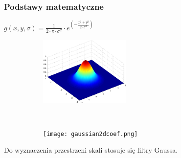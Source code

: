 \begin{frame}
	\frametitle{Podstawy matematyczne}
	
	\begin{center}
		$ g(x,y,\sigma)= \frac{1}{2 \cdot \pi \cdot \sigma ^ {2} }\cdot e^{(-\frac{x^{2} + y^{2}}{2 \cdot \sigma ^{2}})} $

	\begin{figure}[h]
		\begin{center}
			\begin{subfigure}[b]{4.5cm}
				\centering
				\includegraphics[width=4.5cm]{gaussian2d.png}
			\end{subfigure}
			~
			\begin{subfigure}[b]{4.5cm}
				\centering
				\texttt{[image: gaussian2dcoef.png]}
			\end{subfigure}
		\end{center}
	\end{figure}
		
	\end{center}
	
	Do wyznaczenia przestrzeni skali stosuje się filtry Gaussa. 
	
	
\end{frame}
